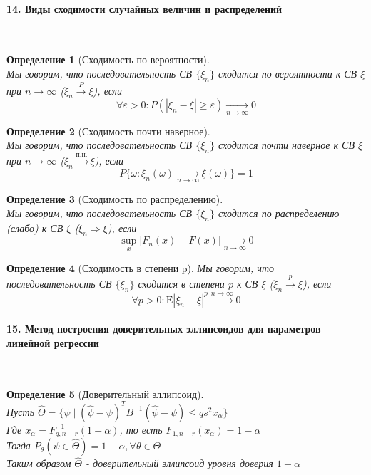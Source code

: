 \documentclass[titlepage]{article}
\newcommand{\sE}{\mathrm{E}}
\newtheorem{definition}{Определение}
\begin{document}
\paragraph{14. Виды сходимости случайных величин и распределений} ~\\
\begin{definition}[Сходимость по вероятности] ~\\
	Мы говорим, что последовательность СВ $\{\xi_n\}$ сходится по вероятности к СВ $\xi$ при $n\rightarrow\infty$ ($\xi_n\overset{P}{\rightarrow}\xi$), если
	\[\forall \varepsilon > 0 : P(|\xi_n-\xi|\geq\varepsilon)\underset{n\rightarrow\infty}{\longrightarrow}0\]
\end{definition}
\begin{definition}[Сходимость почти наверное] ~\\
	Мы говорим, что последовательность СВ $\{\xi_n\}$ сходится почти наверное к СВ $\xi$ при $n\rightarrow\infty$ ($\xi_n \xrightarrow{\text{п.н.}} \xi$), если
	\[P\{\omega:\xi_n(\omega)\underset{n\rightarrow\infty}{\longrightarrow}\xi(\omega)\}=1\]
\end{definition}
\begin{definition}[Сходимость по распределению] ~\\
	Мы говорим, что последовательность СВ $\{\xi_n\}$ сходится по распределению (слабо) к СВ $\xi$ ($\xi_n\Rightarrow\xi$), если
	\[\underset{x}{\sup}|F_n(x) - F(x)|\underset{n\rightarrow\infty}{\longrightarrow}0\]
\end{definition}
\begin{definition}[Сходимость в степени p]
	Мы говорим, что последовательность СВ $\{\xi_n\}$ сходится в степени $p$ к СВ $\xi$ ($\xi_n\overset{p}{\rightarrow}\xi$), если
	\[\forall p > 0: \sE|\xi_n-\xi|^p\overset{n\rightarrow\infty}{\longrightarrow}0\]
\end{definition}
\paragraph{15. Метод построения доверительных эллипсоидов для параметров линейной регрессии} ~\\
\begin{definition}[Доверительный эллипсоид] ~\\
Пусть $\hat\Theta = \{\psi \mid (\hat\psi - \psi)^TB^{-1}(\hat\psi - \psi) \leq qs^2x_\alpha\}$\\
Где $x_\alpha = F^{-1}_{q,n-r}(1-\alpha)$, то есть $F_{1,n-r}(x_\alpha)=1-\alpha$\\
Тогда $P_\theta(\psi \in \hat\Theta) = 1-\alpha, \forall \theta \in \Theta$\\
Таким образом $\hat\Theta$ - доверительный эллипсоид уровня доверия $1-\alpha$
\end{definition}
\end{document}
